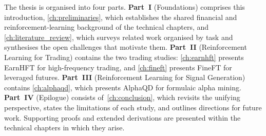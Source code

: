 The thesis is organised into four parts. \textbf{Part~I} (Foundations) comprises this introduction, \cref{ch:preliminaries}, which establishes the shared financial and reinforcement-learning background of the technical chapters, and \cref{ch:literature_review}, which surveys related work organised by task and synthesises the open challenges that motivate them. \textbf{Part~II} (Reinforcement Learning for Trading) contains the two trading studies: \cref{ch:earnhft} presents EarnHFT for high-frequency trading, and \cref{ch:fineft} presents FineFT for leveraged futures. \textbf{Part~III} (Reinforcement Learning for Signal Generation) contains \cref{ch:alphaqd}, which presents AlphaQD for formulaic alpha mining. \textbf{Part~IV} (Epilogue) consists of~\cref{ch:conclusion}, which revisits the unifying perspective, states the limitations of each study, and outlines directions for future work. Supporting proofs and extended derivations are presented within the technical chapters in which they arise.
